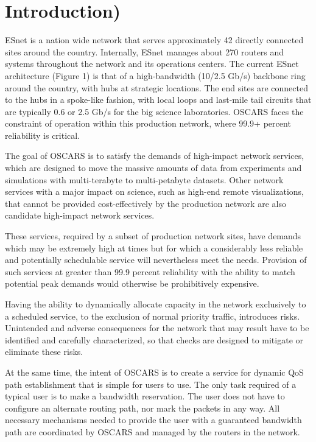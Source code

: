 \documentclass[conference]{IEEEtran}
\begin{document}
\section{Introduction)}
ESnet is a nation wide network that serves approximately 42 directly connected 
sites around the country.  Internally, ESnet manages about 270 routers and 
systems throughout the network and its operations centers.  The current ESnet 
architecture (Figure 1) is that of a high-bandwidth (10/2.5 Gb/s) backbone ring 
around the country, with hubs at strategic locations.  The end sites are 
connected to the hubs in a spoke-like fashion, with local loops and last-mile 
tail circuits that are typically 0.6 or 2.5 Gb/s for the big science 
laboratories.  OSCARS faces the constraint of operation within this production 
network, where 99.9+ percent reliability is critical.

The goal of OSCARS is to satisfy the demands of high-impact network services, 
which are designed to move the massive amounts of data from experiments and 
simulations with multi-terabyte to multi-petabyte datasets.  Other network 
services with a major impact on science, such as high-end remote visualizations,
that cannot be provided cost-effectively by the production network are also 
candidate high-impact network services.

These services, required by a subset of production network sites, have demands 
which may be extremely high at times but for which a considerably less reliable 
and potentially schedulable service will nevertheless meet the needs.  Provision
of such services at greater than 99.9 percent reliability with the ability to 
match potential peak demands would otherwise be prohibitively expensive.

Having the ability to dynamically allocate capacity in the network exclusively 
to a scheduled service, to the exclusion of normal priority traffic, introduces 
risks.  Unintended and adverse consequences for the network that may result
have to be identified and carefully characterized, so that checks are
designed to mitigate or eliminate these risks.

At the same time, the intent of OSCARS is to create a service for dynamic QoS 
path establishment that is simple for users to use. The only task required of a
typical user is to make a bandwidth reservation. The user does not have to 
configure an alternate routing path, nor mark the packets in any way. All 
necessary mechanisms needed to provide the user with a guaranteed bandwidth 
path are coordinated by OSCARS and managed by the routers in the network.
\end{document}
